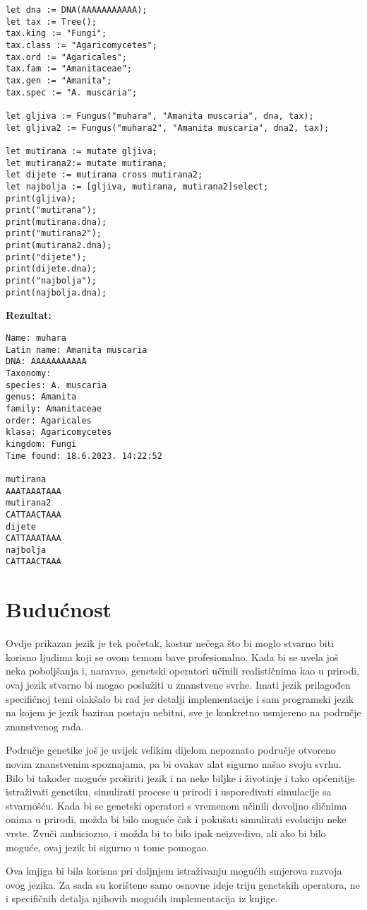 \documentclass[12pt]{scrartcl}
\begin{document}
\begin{lstlisting}
let dna := DNA(AAAAAAAAAAA);
let tax := Tree();
tax.king := "Fungi";
tax.class := "Agaricomycetes";
tax.ord := "Agaricales";
tax.fam := "Amanitaceae";
tax.gen := "Amanita";
tax.spec := "A. muscaria";

let gljiva := Fungus("muhara", "Amanita muscaria", dna, tax);
let gljiva2 := Fungus("muhara2", "Amanita muscaria", dna2, tax);

let mutirana := mutate gljiva;
let mutirana2:= mutate mutirana;
let dijete := mutirana cross mutirana2;
let najbolja := [gljiva, mutirana, mutirana2]select;
print(gljiva);
print("mutirana");
print(mutirana.dna);
print("mutirana2");
print(mutirana2.dna);
print("dijete");
print(dijete.dna);
print("najbolja");
print(najbolja.dna);
\end{lstlisting}
\textbf{Rezultat:}
\begin{lstlisting}
Name: muhara
Latin name: Amanita muscaria
DNA: AAAAAAAAAAA
Taxonomy: 
species: A. muscaria
genus: Amanita
family: Amanitaceae
order: Agaricales
klasa: Agaricomycetes
kingdom: Fungi
Time found: 18.6.2023. 14:22:52

mutirana
AAATAAATAAA
mutirana2
CATTAACTAAA
dijete
CATTAAATAAA
najbolja
CATTAACTAAA
\end{lstlisting}
\section{Budućnost}
Ovdje prikazan jezik je tek početak, kostur nečega što bi moglo stvarno biti korisno ljudima koji se ovom
temom bave profesionalno. Kada bi se uvela još neka poboljšanja i, naravno, genetski operatori učinili
realističnima kao u prirodi, ovaj jezik stvarno bi mogao poslužiti u znanstvene svrhe. Imati jezik
prilagođen specifičnoj temi olakšalo bi rad jer detalji implementacije i sam programski jezik na kojem je
jezik baziran postaju nebitni, sve je konkretno usmjereno na područje znanstvenog rada.


Područje genetike još je uvijek velikim dijelom nepoznato područje otvoreno novim znanstvenim spoznajama,
pa bi ovakav alat sigurno našao svoju svrhu. Bilo bi također moguće proširiti jezik i na neke biljke i
životinje i tako općenitije istraživati genetiku, simulirati procese u prirodi i uspoređivati simulacije sa
stvarnošću. Kada bi se genetski operatori s vremenom učinili dovoljno sličnima onima u prirodi, možda bi
bilo moguće čak i pokušati simulirati evoluciju neke vrste. Zvuči ambiciozno, i možda bi to bilo
ipak neizvedivo, ali ako bi bilo moguće, ovaj jezik bi sigurno u tome pomogao.\nocite{*}

\printbibliography
Ova knjiga bi bila korisna pri daljnjem istraživanju mogućih smjerova razvoja ovog jezika. Za sada su korištene samo osnovne ideje triju
genetskih operatora, ne i specifičnih detalja njihovih mogućih implementacija iz knjige.
\end{document}
